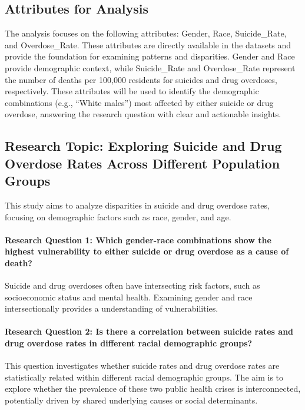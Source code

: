 \documentclass[
  letterpaper,
  DIV=11,
  numbers=noendperiod]{scrartcl}
\let\oldparagraph\paragraph
\renewcommand{\paragraph}[1]{\oldparagraph{#1}\mbox{}}
\begin{document}
\subsection{Attributes for Analysis}\label{attributes-for-analysis}

The analysis focuses on the following attributes: Gender, Race,
Suicide\_Rate, and Overdose\_Rate. These attributes are directly
available in the datasets and provide the foundation for examining
patterns and disparities. Gender and Race provide demographic context,
while Suicide\_Rate and Overdose\_Rate represent the number of deaths
per 100,000 residents for suicides and drug overdoses, respectively.
These attributes will be used to identify the demographic combinations
(e.g., ``White males'') most affected by either suicide or drug
overdose, answering the research question with clear and actionable
insights.

\subsection{Research Topic: Exploring Suicide and Drug Overdose Rates
Across Different Population
Groups}\label{research-topic-exploring-suicide-and-drug-overdose-rates-across-different-population-groups}

This study aims to analyze disparities in suicide and drug overdose
rates, focusing on demographic factors such as race, gender, and age.

\paragraph{Research Question 1: Which gender-race combinations show the
highest vulnerability to either suicide or drug overdose as a cause of
death?}\label{research-question-1-which-gender-race-combinations-show-the-highest-vulnerability-to-either-suicide-or-drug-overdose-as-a-cause-of-death}

Suicide and drug overdoses often have intersecting risk factors, such as
socioeconomic status and mental health. Examining gender and race
intersectionally provides a understanding of vulnerabilities.

\paragraph{Research Question 2: Is there a correlation between suicide
rates and drug overdose rates in different racial demographic
groups?}\label{research-question-2-is-there-a-correlation-between-suicide-rates-and-drug-overdose-rates-in-different-racial-demographic-groups}

This question investigates whether suicide rates and drug overdose rates
are statistically related within different racial demographic groups.
The aim is to explore whether the prevalence of these two public health
crises is interconnected, potentially driven by shared underlying causes
or social determinants.
\end{document}
